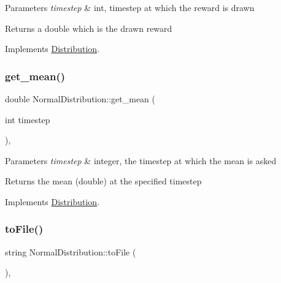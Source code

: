 \begin{DoxyParams}{Parameters}
{\em timestep} & int, timestep at which the reward is drawn \\
\hline
\end{DoxyParams}
\begin{DoxyReturn}{Returns}
a double which is the drawn reward 
\end{DoxyReturn}


Implements \mbox{\hyperlink{class_distribution_a742b398af4a461243028cce3c47d8080}{Distribution}}.

\mbox{\label{class_normal_distribution_ad3165276bf35135409974e73f3cdd6d0}} 
\subsubsection{\texorpdfstring{get\+\_\+mean()}{get\_mean()}}
{\footnotesize\ttfamily double Normal\+Distribution\+::get\+\_\+mean (\begin{DoxyParamCaption}\item[{int}]{timestep }\end{DoxyParamCaption})\hspace{0.3cm}{\ttfamily [override]}, {\ttfamily [virtual]}}


\begin{DoxyParams}{Parameters}
{\em timestep} & integer, the timestep at which the mean is asked \\
\hline
\end{DoxyParams}
\begin{DoxyReturn}{Returns}
the mean (double) at the specified timestep 
\end{DoxyReturn}


Implements \mbox{\hyperlink{class_distribution_ac9c74d18549f532caa09ae86d8b25b55}{Distribution}}.

\mbox{\label{class_normal_distribution_aba8376a8b209a82d8d042c9d2a4c412c}} 
\subsubsection{\texorpdfstring{to\+File()}{toFile()}}
{\footnotesize\ttfamily string Normal\+Distribution\+::to\+File (\begin{DoxyParamCaption}{ }\end{DoxyParamCaption})\hspace{0.3cm}{\ttfamily [override]}, {\ttfamily [virtual]}}



